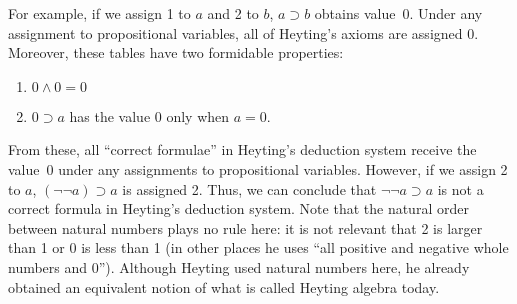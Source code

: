 For example, if we assign 1 to $a$ and 2 to $b$,
$a\supset b$ obtains value~0.
Under any assignment to propositional variables, all of Heyting's axioms
are assigned 0.  Moreover, these tables have two formidable properties:
\begin{enumerate}
 \item $0\land 0 = 0$
 \item $0\supset a$ has the value 0 only when $a = 0$.
\end{enumerate}
From these, all ``correct formulae'' in Heyting's deduction system
receive the value~0 under any assignments to propositional variables.
However, if we assign 2 to $a$, $(\neg \neg a)\supset a$
is assigned 2.  Thus, we can conclude that $\neg \neg a \supset a$ is
not a correct formula in Heyting's deduction system.
Note that the natural order between natural numbers
plays no rule here: it is not relevant that 2 is larger than 1 or 0 is
less than 1 (in other places he uses ``all positive and negative
whole numbers and 0'').  Although Heyting used natural numbers here, he
already obtained an equivalent notion of what is called Heyting algebra
today.

